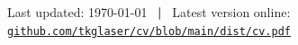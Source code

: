 \documentclass[11pt,a4paper,sans]{moderncv}        %
\renewcommand*{\bibliographyitemlabel}{[\arabic{enumiv}]}
\begin{document}


%


\vfill
\begin{center}
\small\color{gray}
Last updated: \today{} ~\textbf{|}~ Latest version online: \href{https://github.com/tkglaser/cv/blob/main/dist/cv.pdf}{\color{gray}\texttt{github.com/tkglaser/cv/blob/main/dist/cv.pdf}}
\end{center}
\end{document}
